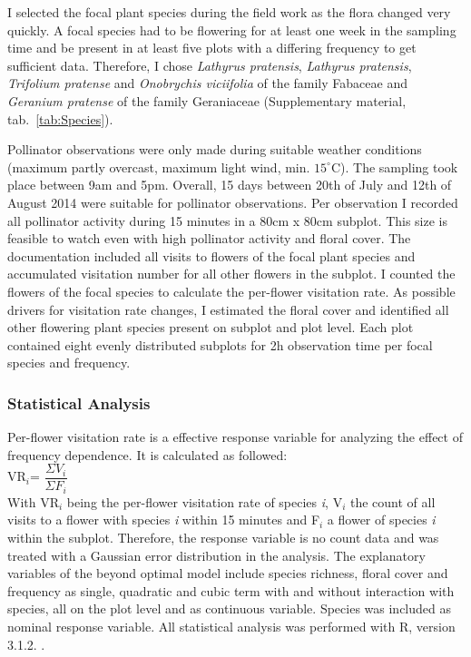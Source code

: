 I selected the focal plant species during the field work as the flora changed very quickly. A focal species had to be flowering for at least one week in the sampling time and be present in at least five plots with a differing frequency to get sufficient data. Therefore, I chose \textit{Lathyrus pratensis}, \textit{Lathyrus pratensis}, \textit{Trifolium pratense} and \textit{Onobrychis viciifolia} of the family Fabaceae and \textit{Geranium pratense} of the family Geraniaceae (Supplementary material, tab.~\ref{tab:Species}).

Pollinator observations were only made during suitable weather conditions (maximum partly overcast, maximum light wind, min. $15 ^\circ\text{C}$). The sampling took place between 9am and 5pm. Overall, 15 days between 20th of July and 12th of August 2014 were suitable for pollinator observations. Per observation I recorded all pollinator activity during 15 minutes in a 80cm x 80cm subplot. This size is feasible to watch even with high pollinator activity and floral cover. The documentation included all visits to flowers of the focal plant species and accumulated visitation number for all other flowers in the subplot. I counted the flowers of the focal species to calculate the per-flower visitation rate. As possible drivers for visitation rate changes, I estimated the floral cover and identified all other flowering plant species present on subplot and plot level. Each plot contained eight evenly distributed subplots for 2h observation time per focal species and frequency. \\


\subsubsection*{Statistical Analysis}

Per-flower visitation rate is a effective response variable for analyzing the effect of frequency dependence. It is calculated as followed:\\


VR$_{\textit{i}}$= $\dfrac{\Sigma V_{\textit{i}}}{\Sigma F_{\textit{i}}}$
\\

With VR$_{\textit{i}}$ being the per-flower visitation rate of species \textit{i}, 
V$_{\textit{i}}$ the count of all visits to a flower with species \textit{i} within 15 minutes and F$_{\textit{i}}$ a flower of species \textit{i} within the subplot. Therefore, the response variable is no count data and was treated with a Gaussian error distribution in the analysis.
The explanatory variables of the beyond optimal model include species richness, floral cover and frequency as single, quadratic and cubic term with and without interaction with species, all on the plot level and as continuous variable. Species was included as nominal response variable. All statistical analysis was performed with R, version 3.1.2. \citep{R}. \\

